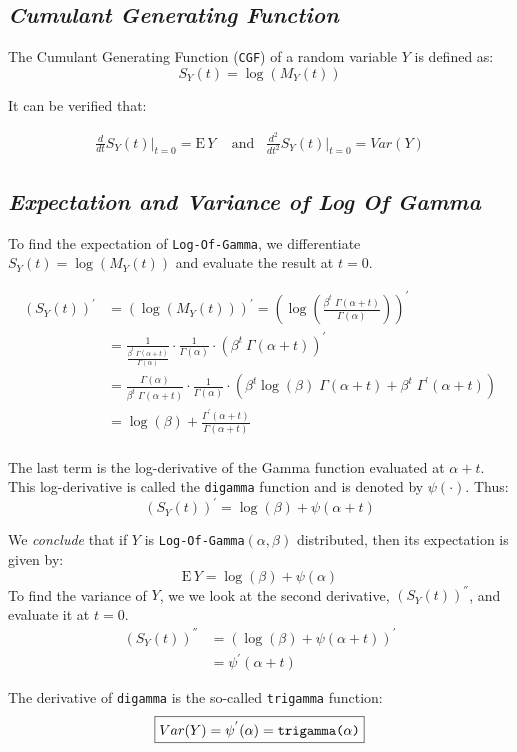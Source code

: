 \documentclass[12pt]{article}
\begin{document}
\subsection*{\color{TealBlue}\emph{Cumulant Generating Function} } 

The Cumulant Generating Function (\texttt{CGF}) of a random variable $Y$ is defined as:
$$
S_Y(t) = \log (M_Y(t))
$$

It can be verified that:


\begin{align*}
\frac{d}{dt} S_Y(t) \Big|_{t=0} = \mathrm{E}\, Y \;\;\; \text{ and} \;\;\; \frac{d^2}{dt^2} S_Y(t) \Big|_{t=0} = Var(Y) 
\end{align*}

\bigskip 
\bigskip 

\subsection*{\color{TealBlue}\emph{Expectation and Variance of Log Of Gamma} } 

To find the expectation of \texttt{Log-Of-Gamma}, we differentiate $S_Y(t) = \log (M_Y(t))$ and evaluate the result at $t = 0$.

\begin{align*}
(S_Y(t))^{'} &= (\log (M_Y(t)))^{'} = \left(\log \left(\frac{\beta^t \; \Gamma(\alpha + t)}{\Gamma(\alpha)} \right)\right)^{'} \\
&= \frac{1}{\frac{\beta^t \; \Gamma(\alpha + t)} {\Gamma(\alpha)}} \cdot \frac{1}{\Gamma(\alpha)} \cdot \left(  \beta^t \: \Gamma(\alpha + t)  \right)^{'}\\
&= \frac{\Gamma(\alpha)}{\beta^t \; \Gamma(\alpha + t)}  \cdot \frac{1}{\Gamma(\alpha)} \cdot \left(  \beta^t \log(\beta) \; \Gamma(\alpha + t) + \beta^t \; \Gamma^{'} (\alpha +t) \right)\\
&= \log(\beta) + \frac{\Gamma^{'} (\alpha +t) }{\Gamma(\alpha + t)}\\
\end{align*}


The last term is the log-derivative of the Gamma function evaluated at $\alpha + t$. This log-derivative is called the \texttt{digamma} function and is denoted by $\psi(\cdot)$. Thus:
$$
\boxed{(S_Y(t))^{'} =  \log(\beta) +\psi(\alpha +t)}
$$

We \emph{conclude} that if $Y$ is \texttt{Log-Of-Gamma}$(\alpha, \beta)$ distributed, then its expectation is given by:
$$
 \boxed{\mathrm{E}\, Y =  \log(\beta) +\psi(\alpha)}
$$
To find the variance of $Y$, we we look at the second derivative, $(S_Y(t))^{''}$, and evaluate it at $t=0$.
\begin{align*}
(S_Y(t))^{''} &= (\log(\beta) +\psi(\alpha +t))^{'}\\
&= \psi^{'}(\alpha +t)
\end{align*}

The derivative of \texttt{digamma} is the so-called \texttt{trigamma} function:
$$
\boxed{Var(Y) = \psi^{'}(\alpha) = \text{\texttt{trigamma($\alpha$)}}}
$$
\end{document}
